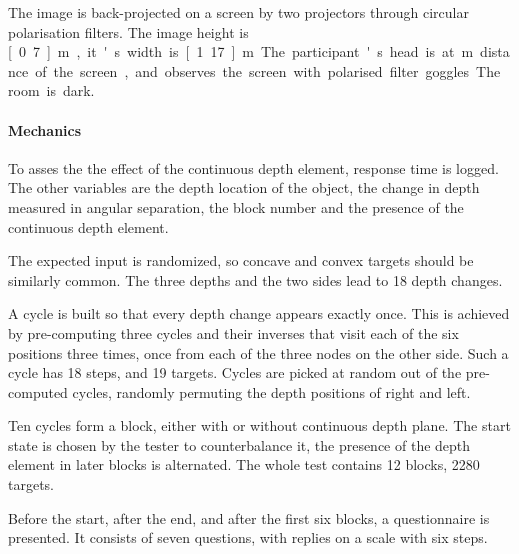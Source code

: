 The image is back-projected on a screen by two projectors through circular polarisation filters. The image height is \unit[0.7]{m}, it's width is \unit[1.17]{m}. The participant's head is at \unit[1]{m} distance of the screen, and observes the screen with polarised filter goggles. The room is dark.

\paragraph{Mechanics}
To asses the the effect of the continuous depth element, response time is logged. The other variables are the depth location of the object, the change in depth measured in angular separation, the block number and the presence of the continuous depth element.

The expected input is randomized, so concave and convex targets should be similarly common. The three depths and the two sides lead to 18 depth changes.

A cycle is built so that every depth change appears exactly once. This is achieved by pre-computing three cycles and their inverses that visit each of the six positions three times, once from each of the three nodes on the other side. Such a cycle has 18 steps, and 19 targets.
Cycles are picked at random out of the pre-computed cycles, randomly permuting the depth positions of right and left.

Ten cycles form a block, either with or without continuous depth plane. The start state is chosen by the tester to counterbalance it, the presence of the depth element in later blocks is alternated.
The whole test contains 12 blocks, 2280 targets.

Before the start, after the end, and after the first six blocks, a questionnaire is presented. It consists of seven questions, with replies on a scale with six steps.
